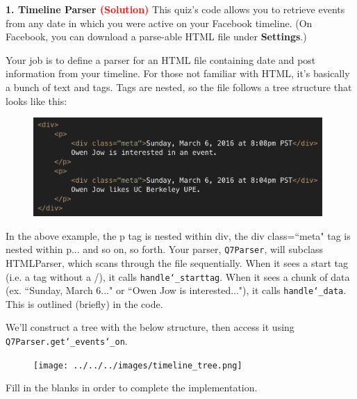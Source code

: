 \documentclass[11pt]{article}
\begin{document}
\textbf{1. Timeline Parser \textcolor{red}{(Solution)}}\newline
This quiz's code allows you to retrieve events from any date in which you were active on your Facebook timeline. (On Facebook, you can download a parse-able HTML file under \textbf{Settings}.)
\newline

Your job is to define a parser for an HTML file containing date and post information from your timeline. For those not familiar with HTML, it's basically a bunch of text and tags. Tags are nested, so the file follows a tree structure that looks like this:
\begin{figure}[ht!]
\includegraphics[width=110mm]{../../../images/html_example.png}
\end{figure}

In the above example, the \textlangle{}p\textrangle{} tag is nested within \textlangle{}div\textrangle{}, the \textlangle{}div class=``meta"\textrangle{} tag is nested within \textlangle{}p\textrangle{}... and so on, so forth. Your parser, \texttt{Q7Parser}, will subclass HTMLParser, which scans through the file sequentially. When it sees a start tag (i.e. a tag without a /), it calls \texttt{handle\char`_starttag}. When it sees a chunk of data (ex. ``Sunday, March 6..." or ``Owen Jow is interested..."), it calls \texttt{handle\char`_data}. This is outlined (briefly) in the code.
\newline

We'll construct a tree with the below structure, then access it using \texttt{Q7Parser.get\char`_events\char`_on}.

\begin{figure}[ht!]
\texttt{[image: ../../../images/timeline\_tree.png]}
\end{figure}

Fill in the blanks in order to complete the implementation.
\end{document}
